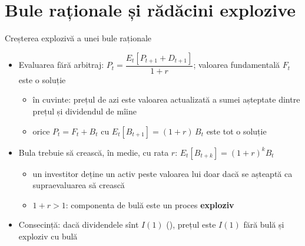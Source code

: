 \section{Bule raționale și rădăcini explozive}

\begin{frame}{Creșterea explozivă a unei bule raționale}
\itemsize{\footnotesize}
\begin{itemize}
    \item Evaluarea fără arbitraj: $P_t = \dfrac{E_t[P_{t+1} + D_{t+1}]}{1+r}$; valoarea fundamentală $F_t$ este o soluție
    \begin{itemize}
        \item în cuvinte: prețul de azi este valoarea actualizată a sumei așteptate dintre prețul și dividendul de mîine
        \item orice $P_t = F_t + B_t$ cu $E_t[B_{t+1}] = (1+r)\,B_t$ este tot o soluție
    \end{itemize}
    \item Bula trebuie să crească, în medie, cu rata $r$: $E_t[B_{t+k}] = (1+r)^k B_t$
    \begin{itemize}
        \item un investitor deține un activ peste valoarea lui doar dacă se așteaptă ca supraevaluarea să crească
        \item $1+r > 1$: componenta de bulă este un proces \textbf{exploziv}
    \end{itemize}
    \item Consecință: dacă dividendele sînt $I(1)$ (), prețul este $I(1)$ fără bulă și exploziv cu bulă
\end{itemize}
\end{frame}

